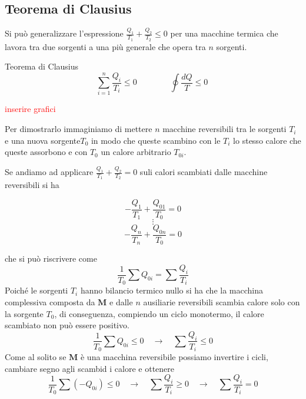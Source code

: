 \documentclass[x11names]{report}
\begin{document}
\subsection{Teorema di Clausius}
Si può generalizzare l'espressione \(\frac{Q_{1}}{T_{1}} + \frac{Q_{2}}{T_{2}} \leq 0\) per una macchine termica che lavora tra due sorgenti a una più generale che opera tra \(n\) sorgenti.
\begin{center}
	\colorbox{yred}{\begin{minipage}{5.75in}
			\begin{redes}{Teorema di Clausius}
				\begin{equation}
					\sum_{i=1}^{n}\frac{Q_{i}}{T_{i}} \leq 0 \qquad \qquad \oint \frac{dQ}{T} \leq 0\
				\end{equation}
			\end{redes}
	\end{minipage}}
\end{center}

\begin{center}
	\textcolor{red}{inserire grafici}
\end{center}

Per dimostrarlo immaginiamo di mettere \(n\) macchine reversibili tra le sorgenti \(T_{i}\) e una nuova sorgente\(T_{0}\) in modo che queste scambino con le \(T_{i}\) lo stesso calore che queste assorbono e con \(T_{0}\) un calore arbitrario \(T_{0i}\). 

Se andiamo ad applicare \(	\frac{Q_{1}}{T_{1}} + \frac{Q_{2}}{T_{2}} = 0\) suli calori scambiati dalle macchine reversibili si ha

\[ 
-\frac{Q_{1}}{T_{1}} + \frac{Q_{01}}{T_{0}}  = 0	
\]
\[
\vdots
\]
\[
-\frac{Q_{n}}{T_{n}} + \frac{Q_{0n}}{T_{0}}  = 0	
\]

che si può riscrivere come
\[ 
\frac{1}{T_{0}}\sum Q_{0i} = \sum \frac{Q_{i}}{T_{i}}
\]
Poiché le sorgenti \(T_{i}\) hanno bilancio termico nullo si ha che la macchina complessiva composta da \(\boldsymbol{M}\) e dalle \(n\) ausiliarie reversibili scambia calore solo con la sorgente \(T_{0}\), di conseguenza, compiendo un ciclo monotermo, il calore scambiato non può essere positivo.	
\[ 
\frac{1}{T_{0}}\sum Q_{0i}\leq 0 \quad \to \quad \boxed{\sum \frac{Q_{i}}{T_{i}} \leq 0}
\]
Come al solito se \(\boldsymbol{M}\) è una macchina reversibile possiamo invertire i cicli, cambiare segno agli scambid i calore e ottenere 
\[ 
\frac{1}{T_{0}}\sum (-Q_{0i})\leq 0 \quad \to \quad \boxed{\sum \frac{Q_{i}}{T_{i}} \geq 0}
 \quad \to \quad \sum \frac{Q_{i}}{T_{i}} = 0
\]
\end{document}

